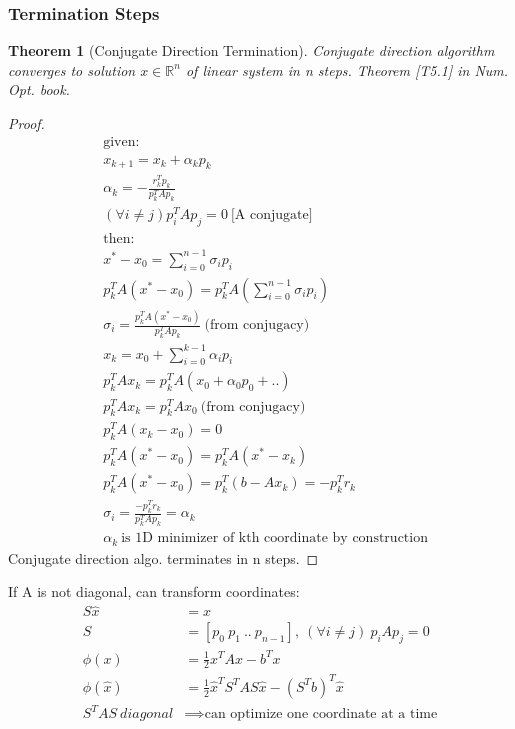 \documentclass[8pt,letter]{article}
\newcommand{\R}{\mathbb{R}}
\newtheorem{theorem}{Theorem}[section]
\begin{document}
\begin{multicols*}{2}
  \subsubsection{Termination Steps}
  \begin{theorem}[Conjugate Direction Termination]\label{thm:CD_Term}
    Conjugate direction algorithm converges to solution $x \in \R^n$ of linear system in n steps. Theorem [T5.1] in Num. Opt. book.
  \end{theorem}
  \begin{proof}
    \begin{align*}
      &\text{given:}\\
      &x_{k+1} = x_k + \alpha_k p_k\\
      &\alpha_k = - \frac{r_k^T p_k}{p_k^T A p_k}\\
      &(\forall i \neq j) p_i^T A p_j = 0\ \text{[A conjugate]}\\
      &\text{then:}\\
      &x^*-x_0 = \sum_{i=0}^{n-1} \sigma_i p_i\\
      &p_k^T A(x^*-x_0) = p_k^T A(\sum_{i=0}^{n-1} \sigma_i p_i)\\
      &\sigma_i = \frac{p_k^T A(x^*-x_0)}{p_k^T A p_k}\ \text{(from conjugacy)}\\
      &x_k = x_0 + \sum_{i=0}^{k-1} \alpha_i p_i\\
      &p_k^T A x_k = p_k^T A (x_0+\alpha_0 p_0 + ..)\\
      &p_k^T A x_k = p_k^T A x_0\ \text{(from conjugacy)}\\
      &p_k^T A (x_k-x_0) = 0\\
      &p_k^T A(x^*-x_0) = p_k^T A(x^*-x_k)\\
      &p_k^T A(x^*-x_0) = p_k^T(b-Ax_k) = -p_k^T r_k\\
      &\sigma_i = \frac{-p_k^T r_k}{p_k^T A p_k} = \alpha_k\\
      &\alpha_k\ \text{is 1D minimizer of kth coordinate by construction}
    \end{align*}
    Conjugate direction algo. terminates in n steps.
  \end{proof}

  If A is not diagonal, can transform coordinates:
  \begin{align*}
    S\hat{x} &= x\\
    S &=[p_0\ p_1\ ..\ p_{n-1}],\ (\forall i \neq j)\ p_i A p_j =0\\
    \phi(x) &= \frac{1}{2} x^T A x - b^T x\\
    \phi(\hat{x}) &= \frac{1}{2} \hat{x}^T S^T A S \hat{x} - (S^T b)^T \hat{x}\\
    S^T A S\ diagonal & \implies \text{can optimize one coordinate at a time}\\
  \end{align*}
  

\end{multicols*}
\end{document}
